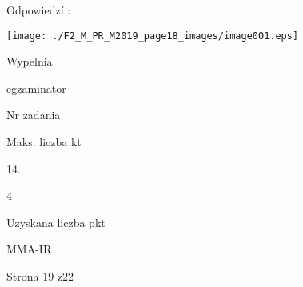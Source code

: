 \documentclass[a4paper,12pt]{article}
\begin{document}
Odpowiedzí :
\begin{center}
\texttt{[image: ./F2\_M\_PR\_M2019\_page18\_images/image001.eps]}
\end{center}
Wypelnia

egzaminator

Nr zadania

Maks. liczba kt

14.

4

Uzyskana liczba pkt

MMA-IR

Strona 19 z22
\end{document}
